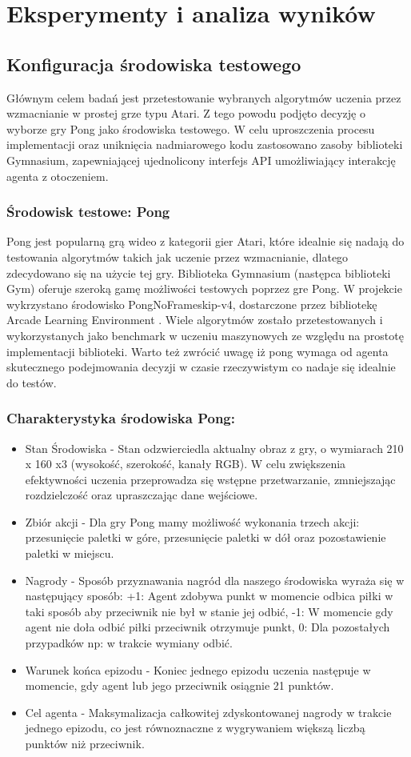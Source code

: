 \documentclass[a4paper, 12pt]{article}
\numberwithin{equation}{section}
\begin{document}
    \section{Eksperymenty i analiza wyników}
    \subsection{Konfiguracja środowiska testowego}
    Głównym celem badań jest przetestowanie wybranych algorytmów uczenia przez wzmacnianie w prostej grze typu Atari. Z tego powodu podjęto decyzję o wyborze gry Pong jako środowiska testowego. W celu uproszczenia procesu implementacji oraz uniknięcia nadmiarowego kodu zastosowano zasoby biblioteki Gymnasium, zapewniającej ujednolicony interfejs API umożliwiający interakcję agenta z otoczeniem.
    \subsubsection{Środowisk testowe: Pong}
    Pong jest popularną grą wideo z kategorii gier Atari, które idealnie się nadają do testowania algorytmów takich jak uczenie przez wzmacnianie,
    dlatego zdecydowano się na użycie tej gry. Biblioteka Gymnasium (następca biblioteki Gym) oferuje szeroką gamę możliwości testowych poprzez gre Pong. W projekcie wykrzystano środowisko PongNoFrameskip-v4, dostarczone przez bibliotekę Arcade Learning Environment \cite{bellemare2013ale}. Wiele algorytmów zostało przetestowanych i wykorzystanych jako benchmark w uczeniu maszynowych ze względu na prostotę implementacji biblioteki. Warto też zwrócić
    uwagę iż pong wymaga od agenta skutecznego podejmowania decyzji w czasie rzeczywistym co nadaje się idealnie do testów.
    \subsubsection{Charakterystyka środowiska Pong:} 
    \begin{itemize}
        \item Stan Środowiska -  Stan odzwierciedla aktualny obraz z gry, o wymiarach 210 x 160 x3  (wysokość, szerokość, kanały RGB). W celu zwiększenia efektywności uczenia przeprowadza się wstępne przetwarzanie, zmniejszając rozdzielczość oraz upraszczając dane wejściowe.
        \item Zbiór akcji - Dla gry Pong mamy możliwość wykonania trzech akcji: przesunięcie paletki w góre, przesunięcie paletki w dół oraz pozostawienie paletki w miejscu.
        \item Nagrody - Sposób przyznawania nagród dla naszego środowiska wyraża się w następujący sposób: +1: Agent zdobywa punkt w momencie odbica piłki w taki sposób aby przeciwnik nie był w stanie jej odbić,
        -1: W momencie gdy agent nie doła odbić piłki przeciwnik otrzymuje punkt, 0: Dla pozostałych przypadków np: w trakcie wymiany odbić.
        \item Warunek końca epizodu - Koniec jednego epizodu uczenia następuje w momencie, gdy agent lub jego przeciwnik osiągnie 21 punktów.
        \item Cel agenta - Maksymalizacja całkowitej zdyskontowanej nagrody w trakcie jednego epizodu, co jest równoznaczne z wygrywaniem większą liczbą punktów niż przeciwnik.
    \end{itemize}
\end{document}

